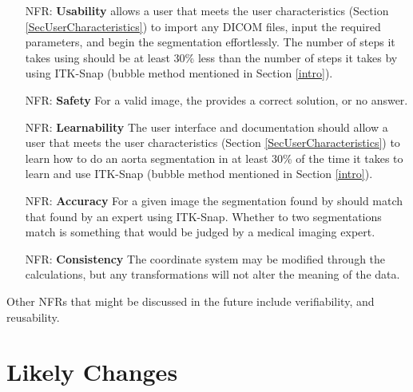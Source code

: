 \documentclass[12pt]{article}
\newcounter{nfrnum} %
\begin{document}
\noindent \begin{itemize}

\item[NFR\refstepcounter{nfrnum}\thenfrnum \label{NFR_GUI}:] \textbf{Usability}
\progname{} allows a user that meets the user characteristics (Section \ref{SecUserCharacteristics})  to import any DICOM files, input the required parameters, and begin the segmentation effortlessly. The number of steps it takes using \progname{} should be at least 30\% less than the number of steps it takes by using ITK-Snap  (bubble method mentioned in Section \ref{intro}).

\item[NFR\refstepcounter{nfrnum}\thenfrnum \label{NFR_Safety}:] \textbf{Safety}
For a valid image, the \progname{} provides a correct solution, or no answer.

\item[NFR\refstepcounter{nfrnum}\thenfrnum \label{NFR_Learnability}:] \textbf{Learnability}
The user interface and documentation should allow a user that meets the user characteristics (Section \ref{SecUserCharacteristics}) to learn how to do an aorta segmentation in at least 30\% of the time it takes to learn and use ITK-Snap (bubble method mentioned in Section \ref{intro}).

\item[NFR\refstepcounter{nfrnum}\thenfrnum \label{NFR_Accuracy}:] \textbf{Accuracy}
For a given image the segmentation found by \progname{} should match that found by an expert using ITK-Snap. Whether to two segmentations match is something that would be judged by a medical imaging expert.

\item[NFR\refstepcounter{nfrnum}\thenfrnum \label{NFR_Consistency}:] \textbf{Consistency}
The coordinate system may be modified through the calculations, but any transformations will not alter the meaning of the data.


\end{itemize}


\noindent Other NFRs that might be discussed in the future include verifiability, and reusability.

\section{Likely Changes}    
\end{document}
